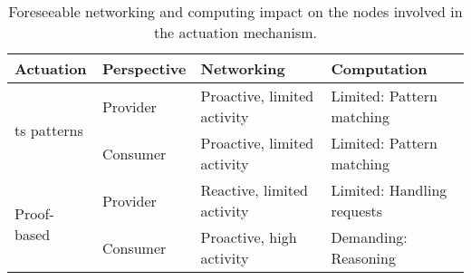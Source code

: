 
\begin{table}[htbp]
  \caption{Foreseeable networking and computing impact on the nodes involved in the actuation mechanism.}
  \begin{center}
    \footnotesize
    \begin{tabular}{llp{4cm}p{4cm}}
      Actuation &
      Perspective &
      Networking &
      Computation \\
      \hline
      \multirow{2}{*}{\ac{ts} patterns} & Provider & Proactive, limited activity & Limited: Pattern matching \\
				    ~ & Consumer & Proactive, limited activity & Limited: Pattern matching \\
      \multirow{2}{*}{Proof-based} & Provider & Reactive, limited activity & Limited: Handling requests \\
                                  ~ & Consumer & Proactive, high activity &  Demanding: Reasoning \\ %
      \hline
    \end{tabular}
  \end{center}
  \label{tab:network_properties}
\end{table}